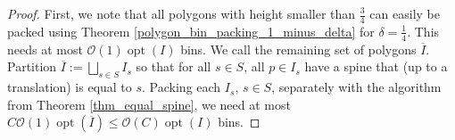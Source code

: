 \documentclass[a4paper,UKenglish,cleveref, autoref, thm-restate]{lipics_v2021}
\DeclareMathOperator{\opt}{opt}
\begin{document}
\begin{proof}
First, we note that all polygons with height smaller than $\frac{3}{4}$ can easily be packed using Theorem \ref{polygon_bin_packing_1_minus_delta} for $\delta = \frac{1}{4}$. This needs at most $\mathcal{O}(1) \opt(I)$ bins. We call the remaining set of polygons $\overline{I}$. Partition $\overline{I}:=\bigsqcup_{s \in S} I_s$ so that for all $s \in S$, all $p \in I_s$ have a spine that (up to a translation) is equal to $s$. Packing each $I_s$, $s \in S$, separately with the algorithm from Theorem \ref{thm_equal_spine}, we need at most $C\mathcal{O}(1)\opt(\overline{I}) \leq \mathcal{O}(C)\opt(I)$ bins.
\end{proof}



\end{document}
